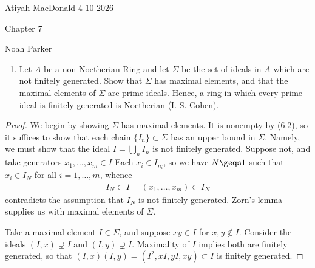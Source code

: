 \documentclass[12pt]{amsart}
\begin{document}
{Atiyah-MacDonald} \hfill {4-10-2026}

\bigskip\bigskip

\begin{center}

{\sc Chapter 7}

\end{center}

\begin{center}

  {Noah Parker} 
    
\end{center}

\bigskip

\begin{enumerate}
	\item[7.1.] {
      Let $A$ be a non-Noetherian Ring and let $\Sigma$ be the set of ideals in $A$ which are not finitely generated.
      Show that $\Sigma$ has maximal elements, and that the maximal elements of $\Sigma$ are prime ideals.
      Hence, a ring in which every prime ideal is finitely generated is Noetherian (I. S. Cohen).
    }
\end{enumerate}

\begin{proof}
  We begin by showing $\Sigma$ has maximal elements.
  It is nonempty by (6.2), so it suffices to show that each chain $\{I_n\}\subset \Sigma$ has an upper bound in $\Sigma$.
  Namely, we must show that the ideal $I=\bigcup_n I_n$ is not finitely generated.
  Suppose not, and take generators $x_1,\ldots, x_m\in I$
  Each $x_i\in I_{n_i}$, so we have $N\geqs 1$ such that $x_i\in I_N$ for all $i=1,\ldots, m$, whence
  \begin{align*}
    I_N\subset I = (x_1,\ldots, x_m)\subset I_N
  \end{align*}
  contradicts the assumption that $I_N$ is not finitely generated.
  Zorn's lemma supplies us with maximal elements of $\Sigma$.

  Take a maximal element $I\in \Sigma$, and suppose $xy\in I$ for $x,y\notin I$.
  Consider the ideals $(I,x)\supsetneq I$ and $(I,y)\supsetneq I$.
  Maximality of $I$ implies both are finitely generated, so that $(I,x)(I,y)=(I^2,xI,yI,xy)\subset I$ is finitely generated.
\end{proof}

\end{document}
